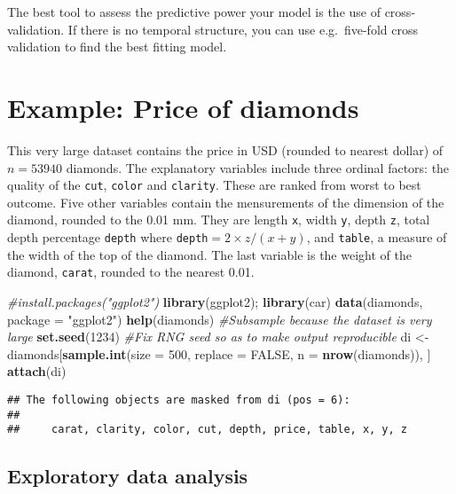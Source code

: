 \documentclass[]{book}
\newenvironment{Shaded}{\begin{snugshade}}{\end{snugshade}}
\newcommand{\CommentTok}[1]{\textcolor[rgb]{0.56,0.35,0.01}{\textit{#1}}}
\newcommand{\DataTypeTok}[1]{\textcolor[rgb]{0.13,0.29,0.53}{#1}}
\newcommand{\DecValTok}[1]{\textcolor[rgb]{0.00,0.00,0.81}{#1}}
\newcommand{\KeywordTok}[1]{\textcolor[rgb]{0.13,0.29,0.53}{\textbf{#1}}}
\newcommand{\NormalTok}[1]{#1}
\newcommand{\OtherTok}[1]{\textcolor[rgb]{0.56,0.35,0.01}{#1}}
\newcommand{\StringTok}[1]{\textcolor[rgb]{0.31,0.60,0.02}{#1}}
\theoremstyle{definition}
\theoremstyle{definition}
\theoremstyle{definition}
\theoremstyle{remark}
\begin{document}
The best tool to assess the predictive power your model is the use of
cross-validation. If there is no temporal structure, you can use
e.g.~five-fold cross validation to find the best fitting model.

\hypertarget{example-price-of-diamonds}{%
\section{Example: Price of diamonds}\label{example-price-of-diamonds}}

This very large dataset contains the price in USD (rounded to nearest
dollar) of \(n=53940\) diamonds. The explanatory variables include three
ordinal factors: the quality of the \texttt{cut}, \texttt{color} and
\texttt{clarity}. These are ranked from worst to best outcome. Five
other variables contain the mensurements of the dimension of the
diamond, rounded to the 0.01 mm. They are length \texttt{x}, width
\texttt{y}, depth \texttt{z}, total depth percentage \texttt{depth}
where \texttt{depth}\(=2\times z/(x + y)\), and \texttt{table}, a
measure of the width of the top of the diamond. The last variable is the
weight of the diamond, \texttt{carat}, rounded to the nearest 0.01.

\begin{Shaded}
\begin{Highlighting}[]
\CommentTok{#install.packages("ggplot2")}
\KeywordTok{library}\NormalTok{(ggplot2); }\KeywordTok{library}\NormalTok{(car)}
\KeywordTok{data}\NormalTok{(diamonds, }\DataTypeTok{package =} \StringTok{"ggplot2"}\NormalTok{)}
\KeywordTok{help}\NormalTok{(diamonds)}
\CommentTok{#Subsample because the dataset is very large}
\KeywordTok{set.seed}\NormalTok{(}\DecValTok{1234}\NormalTok{) }\CommentTok{#Fix RNG seed so as to make output reproducible}
\NormalTok{di <-}\StringTok{ }\NormalTok{diamonds[}\KeywordTok{sample.int}\NormalTok{(}\DataTypeTok{size =} \DecValTok{500}\NormalTok{, }\DataTypeTok{replace =} \OtherTok{FALSE}\NormalTok{, }\DataTypeTok{n =} \KeywordTok{nrow}\NormalTok{(diamonds)), ]}
\KeywordTok{attach}\NormalTok{(di)}
\end{Highlighting}
\end{Shaded}

\begin{verbatim}
## The following objects are masked from di (pos = 6):
## 
##     carat, clarity, color, cut, depth, price, table, x, y, z
\end{verbatim}

\hypertarget{exploratory-data-analysis}{%
\subsection{Exploratory data analysis}\label{exploratory-data-analysis}}
\end{document}
